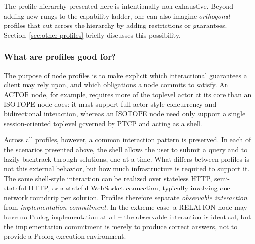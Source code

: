 The profile hierarchy presented here is intentionally non-exhaustive. Beyond adding new rungs to the capability ladder, one can also imagine \emph{orthogonal} profiles that cut across the hierarchy by adding restrictions or guarantees. Section~\ref{sec:other-profiles} briefly discusses this possibility.




\subsubsection*{What are profiles good for?}\label{sec:profiles-why}

The purpose of node profiles is to make explicit which interactional guarantees a client may rely upon, and which obligations a node commits to satisfy. An ACTOR node, for example, requires more of the toplevel actor at its core than an ISOTOPE node does: it must support full actor-style concurrency and bidirectional interaction, whereas an ISOTOPE node need only support a single session-oriented toplevel governed by PTCP and acting as a shell.

Across all profiles, however, a common interaction pattern is preserved. In each of the scenarios presented above, the shell allows the user to submit a query and to lazily backtrack through solutions, one at a time. What differs between profiles is not this external behavior, but how much infrastructure is required to support it. The same shell-style interaction can be realized over stateless HTTP, semi-stateful HTTP, or a stateful WebSocket connection, typically involving one network roundtrip per solution. Profiles therefore separate \emph{observable interaction} from \emph{implementation commitment}. In the extreme case, a RELATION node may have no Prolog implementation at all -- the observable interaction is identical, but the implementation commitment is merely to produce correct answers, not to provide a Prolog execution environment.

